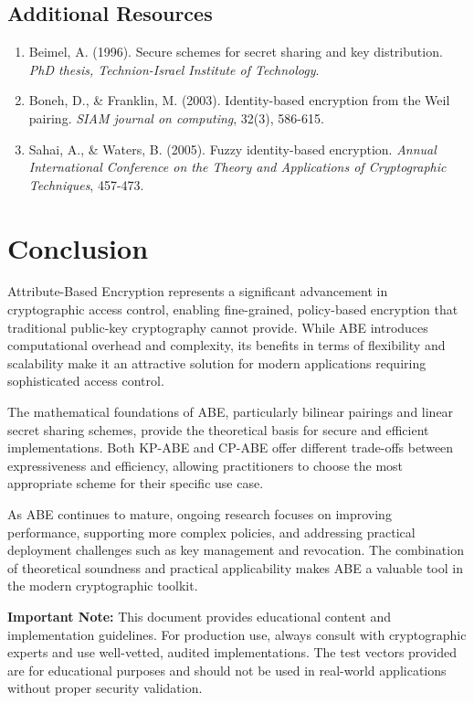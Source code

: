 \documentclass[11pt,a4paper]{article}
\begin{document}
\subsection{Additional Resources}

\begin{enumerate}
    \item Beimel, A. (1996). Secure schemes for secret sharing and key distribution. \textit{PhD thesis, Technion-Israel Institute of Technology}.
    \item Boneh, D., \& Franklin, M. (2003). Identity-based encryption from the Weil pairing. \textit{SIAM journal on computing}, 32(3), 586-615.
    \item Sahai, A., \& Waters, B. (2005). Fuzzy identity-based encryption. \textit{Annual International Conference on the Theory and Applications of Cryptographic Techniques}, 457-473.
\end{enumerate}

\section{Conclusion}

Attribute-Based Encryption represents a significant advancement in cryptographic access control, enabling fine-grained, policy-based encryption that traditional public-key cryptography cannot provide. While ABE introduces computational overhead and complexity, its benefits in terms of flexibility and scalability make it an attractive solution for modern applications requiring sophisticated access control.

The mathematical foundations of ABE, particularly bilinear pairings and linear secret sharing schemes, provide the theoretical basis for secure and efficient implementations. Both KP-ABE and CP-ABE offer different trade-offs between expressiveness and efficiency, allowing practitioners to choose the most appropriate scheme for their specific use case.

As ABE continues to mature, ongoing research focuses on improving performance, supporting more complex policies, and addressing practical deployment challenges such as key management and revocation. The combination of theoretical soundness and practical applicability makes ABE a valuable tool in the modern cryptographic toolkit.

\begin{warningbox}
\textbf{Important Note:} This document provides educational content and implementation guidelines. For production use, always consult with cryptographic experts and use well-vetted, audited implementations. The test vectors provided are for educational purposes and should not be used in real-world applications without proper security validation.
\end{warningbox}
\end{document}
